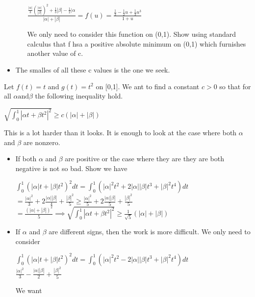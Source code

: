 \documentclass[11pt]{SelfArxOneColBMN}
\begin{document}
\begin{exercise}
\begin{itemize}
\begin{enumerate}
		\begin{center}
			$\frac{\frac{|\alpha|}{3}(\frac{|\alpha|}{|\beta|})^2 + \frac{1}{3}|\beta| - \frac{1}{2}|\alpha}{|\alpha| + |\beta|} = f(u) = \frac{\frac{1}{3} - \frac{1}{2}u + \frac{1}{3}u^3}{1 + u}$
		\end{center}
		We only need to consider this function on (0,1). Show using standard calculus that f hsa a positive absolute minimum on (0,1) which furnishes another value of c.
	\end{enumerate}
	\item The smalles of all these c values is the one we seek.
	\end{itemize}
\end{exercise}

\begin{exercise}
	Let $f(t) = t$ and $g(t) = t^2$ on [0,1]. We ant to find a constant $c > 0$ so that for all $\alpha \text{and} \beta$ the following inequality hold.
	\begin{center}
		$\sqrt{\int_0^1|\alpha t + \beta t^2|^2} \geq c(|\alpha| + |\beta|)$
	\end{center}
	This is a lot harder than it looks. It is enough to look at the case where both $\alpha$ and $\beta$ are nonzero.
	\begin{itemize}
				\item If both $\alpha$ and $\beta$ are positive or the case where they are they are both negative is not so bad. Show we have
			\begin{center}
				$\int_0^1 (|\alpha|t + |\beta|t^2)^2dt = \int_0^1 (|\alpha|^2t^2 + 2|\alpha||\beta|t^3 + |\beta|^2t^4)dt$\\
				$= \frac{|\alpha|^2}{3} + 2\frac{|\alpha||\beta|}{4} + \frac{|\beta|^2}{5} \geq \frac{|\alpha|^2}{5} + 2\frac{|\alpha||\beta|}{5} + \frac{|\beta|^2}{5}$\\
				$= \frac{(|\alpha| + |\beta|)^2}{5} \implies \sqrt{\int_0^1|\alpha t + \beta t^2|^2} \geq \frac{1}{\sqrt{5}}(|\alpha| + |\beta|)$
			\end{center}
			\item If $\alpha$ and $\beta$ are different signs, then the work is more difficult. We only need to consider
			\begin{center}
				$\int_0^1 (|\alpha| t + |\beta| t^2)^2dt = \int_0^1(|\alpha|^2t^2 - 2|\alpha||\beta|t^3 + |\beta|^2t^4)dt$\\
				$\frac{|\alpha|^2}{3} - \frac{|\alpha||\beta|}{2} + \frac{|\beta|^2}{5}$
			\end{center}
			We want

\end{itemize}
\end{exercise}
\end{document}
